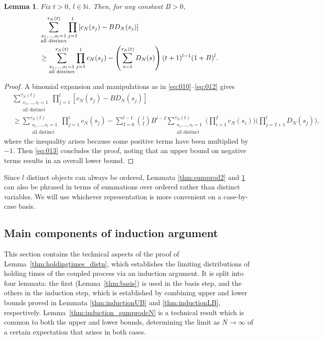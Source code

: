 \documentclass[12pt,authoryear]{article}
\newtheorem{lemma}{Lemma}
\theoremstyle{definition}
\newcommand{\1}[1]{\mathbbm{1}_{#1}}
\begin{document}
\begin{lemma}\label{thm:sumprod3}
Fix $t>0$, $l\in\mathbb{N}$.
Then, for any constant $B>0$,
\begin{align*}
&\sum_{\substack{ s_1, \dots, s_l =1 \\ \text{\normalfont{all distinct}} }}^{\tau_N(t)} 
        \prod_{j=1}^l \left[ c_N(s_j) - B D_N(s_j) \right] \\
&\geq \sum_{\substack{ s_1, \dots, s_l =1 \\ \text{\normalfont{all distinct}} }}^{\tau_N(t)} 
        \prod_{j=1}^l c_N(s_j)
        - \left( \sum_{s=1}^{\tau_N(t)} D_N(s) \right) (t+1)^{l-1} (1+B)^l .
\end{align*}
\end{lemma}

\begin{proof}
A binomial expansion and manipulations as in \eqref{eq:010}--\eqref{eq:012} gives
\begin{align*}
&\sum_{\substack{ s_1, \dots, s_l =1 \\ \text{all distinct} }}^{\tau_N(t)} 
        \prod_{j=1}^l 
        \left[ c_N(s_j) - B D_N(s_j) \right] \\
&\geq \sum_{\substack{ s_1, \dots, s_l =1 \\ \text{all distinct} }}^{\tau_N(t)} 
        \prod_{j=1}^l c_N(s_j) - \sum_{I=0}^{l-1} \binom{l}{I} B^{l-I} 
        \sum_{\substack{ s_1, \dots, s_l =1 \\ \text{all distinct} }}^{\tau_N(t)}
        \Bigg( \prod_{i=1}^I c_N(s_i) \Bigg) \Bigg( \prod_{j=I+1}^l D_N(s_j) \Bigg),
\end{align*}
where the inequality arises because some positive terms have been multiplied by $-1$.
Then \eqref{eq:013} concludes the proof, noting that an upper bound on negative terms results in an overall lower bound.
\end{proof}

Since $l$ distinct objects can always be ordered, Lemmata \ref{thm:sumprod2} and \ref{thm:sumprod3} can also be phrased in terms of summations over ordered rather than distinct variables.
We will use whichever representation is more convenient on a case-by-case basis.

\subsection{Main components of induction argument}\label{sec:main_components_of_induction}
This section contains the technical aspects of the proof of Lemma~\ref{thm:holdingtimes_distn}, which establishes the limiting distributions of holding times of the coupled process via an induction argument.
It is split into four lemmata: the first (Lemma~\ref{thm:basis}) is used in the basis step, and the others in the induction step, which is established by combining upper and lower bounds proved in Lemmata \ref{thm:inductionUB} and \ref{thm:inductionLB}, respectively.
Lemma~\ref{thm:induction_sumprodcN} is a technical result which is common to both the upper and lower bounds, determining the limit as $N\to\infty$ of a certain expectation that arises in both cases.
\end{document}
